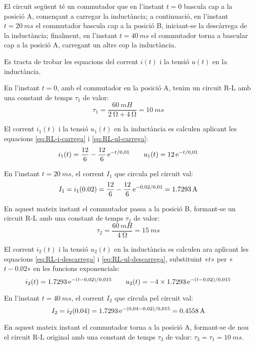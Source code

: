 \begin{exemple}\label{ex:carrega-descarrega-RL}
    El circuit següent té un commutador que en l'instant $t=0$ bascula cap a la posició A, començant a carregar la inductància; a continuació, en l'instant $t=\SI{20}{ms}$ el commutador bascula cap a la posició B, iniciant-se la descàrrega de la inductància; finalment, en  l'instant $t=\SI{40}{ms}$ el commutador torna a  bascular cap a la posició A, carregant un altre cop la inductància.

    Es tracta de trobar les equacions del corrent $i(t)$ i la tensió $u(t)$ en la inductància.

    \begin{center}
        
    \end{center}

    En l'instant $t=0$, amb el commutador en la posició A, tenim un circuit R-L amb una constant de temps $\tau_1$ de valor:
    \[
        \tau_1 = \frac{\SI{60}{mH}}{\SI{2}{\ohm}+\SI{4}{\ohm}} = \SI{10}{ms}
    \]

    El corrent $i_1(t)$ i la tensió $u_1(t)$ en la inductància es calculen aplicant les equacions \eqref{eq:RL-i-carrega} i \eqref{eq:RL-ul-carrega}:
    \[
        i_1(t) = \frac{12}{6} - \frac{12}{6}\,\mathrm{e}^{-t/0,01} \qquad
        u_1(t) = 12\,\mathrm{e}^{-t/0,01}
    \]

    En l'instant $t=\SI{20}{ms}$, el corrent $I_1$ que circula pel circuit val:
    \[
        I_1 = i_1(\num{0,02}) = \frac{12}{6} - \frac{12}{6}\,\mathrm{e}^{-0,02/0,01} = \SI{1,7293}{A}
    \]

    En aquest mateix instant  el commutador passa a la posició B, formant-se un circuit R-L amb una constant de temps $\tau_2$ de valor:
    \[
        \tau_2 = \frac{\SI{60}{mH}}{\SI{4}{\ohm}} = \SI{15}{ms}
    \]

    El corrent $i_2(t)$ i la tensió $u_2(t)$ en la inductància es calculen ara aplicant les equacions \eqref{eq:RL-i-descarrega} i \eqref{eq:RL-ul-descarrega}, substituint «$t$» per «$t-\num{0,02}$» en les funcions exponencials:
    \[
        i_2(t) = \num{1,7293}\,\mathrm{e}^{-(t-0,02)/0,015} \qquad
        u_2(t) = -4\times\num{1,7293}\,\mathrm{e}^{-(t-0,02)/0,015}
    \]

    En l'instant $t=\SI{40}{ms}$, el corrent $I_2$ que circula pel circuit val:
    \[
        I_2 = i_2(\num{0,04}) = \num{1,7293}\,\mathrm{e}^{-(0,04-0,02)/0,015} = \SI{0,4558}{A}
    \]

    En aquest mateix instant  el commutador torna a la posició A, formant-se de nou el circuit R-L original amb una constant de temps $\tau_3$ de valor: $\tau_3 = \tau_1 = \SI{10}{ms}$.


\end{exemple}
